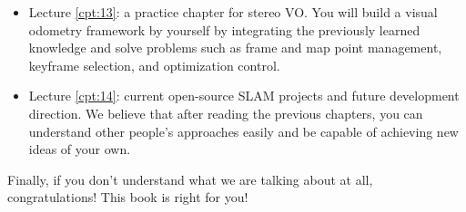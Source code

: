\begin{English}
\begin{itemize}
    	\item Lecture \ref{cpt:13}: a practice chapter for stereo VO. You will build a visual odometry framework by yourself by integrating the previously learned knowledge and solve problems such as frame and map point management, keyframe selection, and optimization control.
    
    	\item Lecture \ref{cpt:14}: current open-source SLAM projects and future development direction. We believe that after reading the previous chapters, you can understand other people's approaches easily and be capable of achieving new ideas of your own.
    \end{itemize}
    
    Finally, if you don't understand what we are talking about at all, congratulations! This book is right for you!
\end{English}

